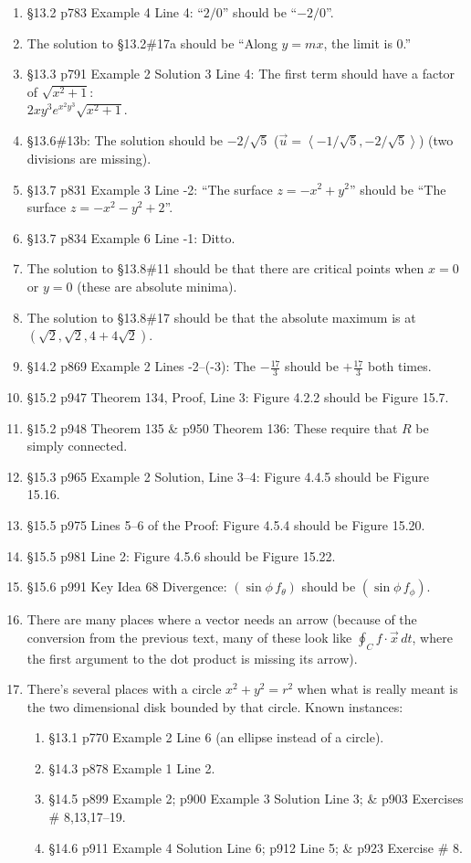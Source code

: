 \documentclass{amsart}
\newcommand{\bracket}[1]{\left\langle#1\right\rangle}
\begin{document}
\begin{enumerate}
\item \S13.2 p783 Example 4 Line 4: ``$2/0$'' should be ``$-2/0$''.
\item The solution to \S13.2\#17a should be ``Along $y=mx$, the limit is 0.''
\item \S13.3 p791 Example 2 Solution 3 Line 4: The first term should have a factor of $\sqrt{x^2+1}$:\\
$2xy^3e^{x^2y^3}\sqrt{x^2+1}$.
\item \S13.6\#13b: The solution should be $-2/\sqrt5$ ($\vec u =\bracket{-1/\sqrt5,-2/\sqrt5}$) (two divisions are missing).
\item \S13.7 p831 Example 3 Line -2: ``The surface $z=-x^2+y^2$'' should be ``The surface $z=-x^2-y^2+2$''.
\item \S13.7 p834 Example 6 Line -1: Ditto.
\item The solution to \S13.8\#11 should be that there are critical points when $x=0$ or $y=0$ (these are absolute minima).
\item The solution to \S13.8\#17 should be that the absolute maximum is at $(\sqrt2,\sqrt2,4+4\sqrt2)$.
\item \S14.2 p869 Example 2 Lines -2--(-3): The $-\frac{17}3$ should be $+\frac{17}3$ both times.
\item \S15.2 p947 Theorem 134, Proof, Line 3: Figure 4.2.2 should be Figure 15.7.
\item \S15.2 p948 Theorem 135 \& p950 Theorem 136: These require that $R$ be simply connected.
\item \S15.3 p965 Example 2 Solution, Line 3--4: Figure 4.4.5 should be Figure 15.16.
\item \S15.5 p975 Lines 5--6 of the Proof: Figure 4.5.4 should be Figure 15.20.
\item \S15.5 p981 Line 2: Figure 4.5.6 should be Figure 15.22.
\item \S15.6 p991 Key Idea 68 Divergence: $(\sin \phi \,f_{\theta})$ should be $(\sin \phi \,f_{\phi})$.
\item There are many places where a vector needs an arrow (because of the conversion from the previous text, many of these look like $\oint_C f\cdot\vec x\,dt$, where the first argument to the dot product is missing its arrow).
\item There's several places with a circle $x^2+y^2=r^2$ when what is really meant is the two dimensional disk bounded by that circle.  Known instances:
\begin{enumerate}
\item \S13.1 p770 Example 2 Line 6 (an ellipse instead of a circle).
\item \S14.3 p878 Example 1 Line 2.
\item \S14.5 p899 Example 2; p900 Example 3 Solution Line 3; \& p903 Exercises \# 8,13,17--19.
\item \S14.6 p911 Example 4 Solution Line 6; p912 Line 5; \& p923 Exercise \# 8.
\end{enumerate}
\label{2017-05-00IIIplus}
\end{enumerate}
\end{document}

